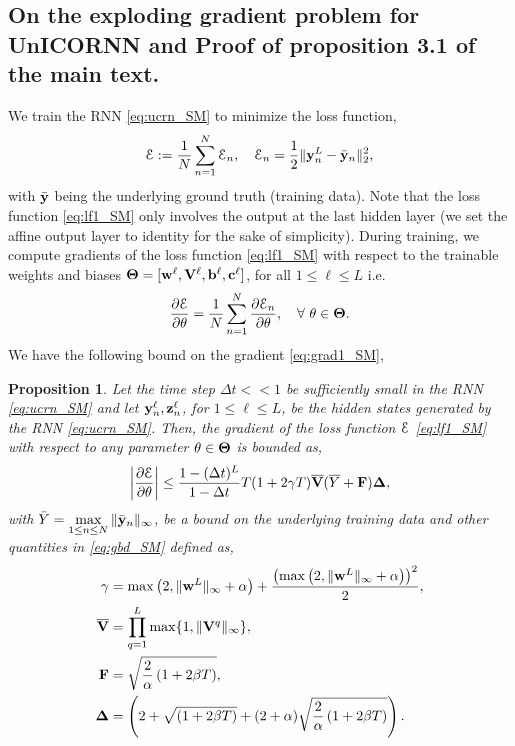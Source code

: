 \documentclass{article}
\newtheorem{proposition}[theorem]{Proposition}
\newcommand{\by}{{\bf y}}
\newcommand{\bz}{{\bf z}}
\newcommand{\bw}{{\bf w}}
\newcommand{\bb}{{\bf b}}
\newcommand{\bV}{{\bf V}}
\newcommand{\bc}{{\bf c}}
\newcommand{\Dt}{{\Delta t}}
\newcommand{\E}{\EuScript{E}}
\begin{document}
\subsection{On the exploding gradient problem for UnICORNN and Proof of proposition 3.1 of the main text.}
We train the RNN \eqref{eq:ucrn_SM} to minimize the loss function,
\begin{equation}
\label{eq:lf1_SM}
\E := \frac{1}{N}\sum\limits_{n=1}^N \E_n, \quad \E_n = \frac{1}{2} \|\by^L_n - \bar{\by}_n\|_2^2,
\end{equation}
with $\bar{\by}$ being the underlying ground truth (training data). Note that the loss function \eqref{eq:lf1_SM} only involves the output at the last hidden layer (we set the affine output layer to identity for the sake of simplicity). During training, we compute gradients of the loss function \eqref{eq:lf1_SM} with respect to the trainable weights and biases $\bf \Theta = [\bw^\ell,\bV^{\ell}, \bb^\ell,\bc^\ell]$, for all $1 \leq \ell \leq L$ i.e.
\begin{equation}
\label{eq:grad1_SM}
\frac{\partial \E}{\partial \theta} = \frac{1}{N}\sum_{n=1}^N \frac{\partial \E_n}{\partial \theta}, \quad \forall ~\theta \in {\bf \Theta}.
\end{equation} 
We have the following bound on the gradient \eqref{eq:grad1_SM},
\begin{proposition}
\label{prop:3_SM}
Let the time step $\Dt << 1$ be sufficiently small in the RNN \eqref{eq:ucrn_SM} and let $\by^\ell_n,\bz^\ell_n$, for $1 \leq \ell \leq L$, be the hidden states generated by the RNN \eqref{eq:ucrn_SM}. Then, the gradient of the loss function $\E$ \eqref{eq:lf1_SM} with respect to any parameter $\theta \in {\bf \Theta}$ is bounded as,
\begin{equation}
    \label{eq:gbd_SM}
    \left|\frac{\partial \E}{\partial \theta}\right| \leq \frac{1-(\Dt)^L}{1-\Dt}T (1+2\gamma T) \overline{\bV}(\overline{Y} + {\bf F}){\bf \Delta},
\end{equation}
with $\bar{Y} = \max\limits_{1 \leq n \leq N} \|\bar{\by}_n\|_{\infty}$, be a bound on the underlying training data and other quantities in \eqref{eq:gbd_SM} defined as,
\begin{equation}
    \label{eq:gbddef_SM}
    \begin{aligned}
\gamma &= \max\left(2,\|\bw^{L}\|_{\infty}+\alpha\right) + \frac{\left(\max\left(2,\|\bw^{L}\|_{\infty}+\alpha\right)\right)^2}{2}, \\
    \overline{\bV} &= \prod\limits_{q=1}^L \max\{1, \|\bV^q\|_{\infty}\}, \\
    {\bf F} &= \sqrt{\frac{2}{\alpha}\left(1+2\beta T\right)}, \\
    {\bf \Delta} &= \left(2 + \sqrt{\left(1+2\beta T\right)} + (2+\alpha) \sqrt{\frac{2}{\alpha}\left(1+2\beta T\right)}\right).
    \end{aligned}
\end{equation}
\end{proposition}
\end{document}
